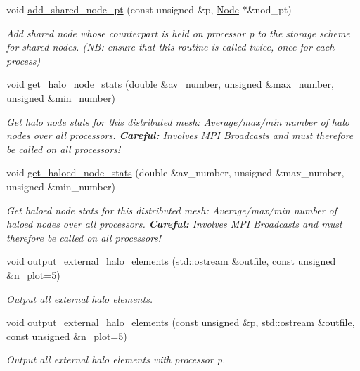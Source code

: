 \begin{DoxyCompactItemize}
void \hyperlink{classoomph_1_1Mesh_a3b81e17514396174f857d412a8c6abd7}{add\+\_\+shared\+\_\+node\+\_\+pt} (const unsigned \&p, \hyperlink{classoomph_1_1Node}{Node} $\ast$\&nod\+\_\+pt)
\begin{DoxyCompactList}\small\item\em Add shared node whose counterpart is held on processor p to the storage scheme for shared nodes. (NB\+: ensure that this routine is called twice, once for each process) \end{DoxyCompactList}\item 
void \hyperlink{classoomph_1_1Mesh_ac8b298686d35c27b0cbcb7453786b543}{get\+\_\+halo\+\_\+node\+\_\+stats} (double \&av\+\_\+number, unsigned \&max\+\_\+number, unsigned \&min\+\_\+number)
\begin{DoxyCompactList}\small\item\em Get halo node stats for this distributed mesh\+: Average/max/min number of halo nodes over all processors. {\bfseries Careful\+:} Involves M\+PI Broadcasts and must therefore be called on all processors! \end{DoxyCompactList}\item 
void \hyperlink{classoomph_1_1Mesh_a4f7b8beffb9f4b5f95842edf4d8af4c6}{get\+\_\+haloed\+\_\+node\+\_\+stats} (double \&av\+\_\+number, unsigned \&max\+\_\+number, unsigned \&min\+\_\+number)
\begin{DoxyCompactList}\small\item\em Get haloed node stats for this distributed mesh\+: Average/max/min number of haloed nodes over all processors. {\bfseries Careful\+:} Involves M\+PI Broadcasts and must therefore be called on all processors! \end{DoxyCompactList}\item 
void \hyperlink{classoomph_1_1Mesh_a1bf4b7961c46409b20b33083d7537eba}{output\+\_\+external\+\_\+halo\+\_\+elements} (std\+::ostream \&outfile, const unsigned \&n\+\_\+plot=5)
\begin{DoxyCompactList}\small\item\em Output all external halo elements. \end{DoxyCompactList}\item 
void \hyperlink{classoomph_1_1Mesh_a627b80ad5ef71a660ee7760735c0486a}{output\+\_\+external\+\_\+halo\+\_\+elements} (const unsigned \&p, std\+::ostream \&outfile, const unsigned \&n\+\_\+plot=5)
\begin{DoxyCompactList}\small\item\em Output all external halo elements with processor p. \end{DoxyCompactList}\item 

\end{DoxyCompactItemize}
